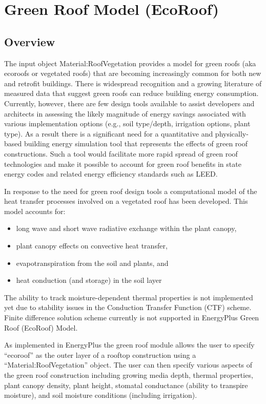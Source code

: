 \section{Green Roof Model (EcoRoof)}\label{green-roof-model-ecoroof}

\subsection{Overview}\label{overview-018}

The input object Material:RoofVegetation provides a model for green roofs (aka ecoroofs or vegetated roofs) that are becoming increasingly common for both new and retrofit buildings. There is widespread recognition and a growing literature of measured data that suggest green roofs can reduce building energy consumption. Currently, however, there are few design tools available to assist developers and architects in assessing the likely magnitude of energy savings associated with various implementation options (e.g., soil type/depth, irrigation options, plant type). As a result there is a significant need for a quantitative and physically-based building energy simulation tool that represents the effects of green roof constructions. Such a tool would facilitate more rapid spread of green roof technologies and make it possible to account for green roof benefits in state energy codes and related energy efficiency standards such as LEED.

In response to the need for green roof design tools a computational model of the heat transfer processes involved on a vegetated roof has been developed. This model accounts for:

\begin{itemize}
\item
  long wave and short wave radiative exchange within the plant canopy,
\item
  plant canopy effects on convective heat transfer,
\item
  evapotranspiration from the soil and plants, and
\item
  heat conduction (and storage) in the soil layer
\end{itemize}

The ability to track moisture-dependent thermal properties is not implemented yet due to stability issues in the Conduction Transfer Function (CTF) scheme. Finite difference solution scheme currently is not supported in EnergyPlus Green Roof (EcoRoof) Model.

As implemented in EnergyPlus the green roof module allows the user to specify ``ecoroof'' as the outer layer of a rooftop construction using a ``Material:RoofVegetation'' object. The user can then specify various aspects of the green roof construction including growing media depth, thermal properties, plant canopy density, plant height, stomatal conductance (ability to transpire moisture), and soil moisture conditions (including irrigation).

